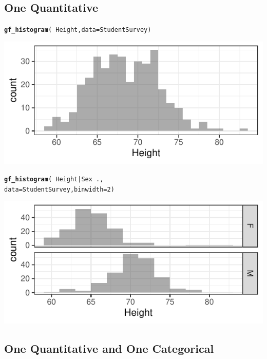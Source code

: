 \documentclass[10pt]{report}\usepackage[]{graphicx}\usepackage[]{xcolor}
\makeatletter
\newcommand{\hlnum}[1]{\textcolor[rgb]{0.686,0.059,0.569}{#1}}%
\newcommand{\hlopt}[1]{\textcolor[rgb]{0,0,0}{#1}}%
\newcommand{\hldef}[1]{\textcolor[rgb]{0.345,0.345,0.345}{#1}}%
\newcommand{\hlkwc}[1]{\textcolor[rgb]{0.333,0.667,0.333}{#1}}%
\newcommand{\hlkwd}[1]{\textcolor[rgb]{0.737,0.353,0.396}{\textbf{#1}}}%
\newenvironment{kframe}{%
 \def\at@end@of@kframe{}%
 \ifinner\ifhmode%
  \def\at@end@of@kframe{\end{minipage}}%
  \begin{minipage}{\columnwidth}%
 \fi\fi%
 \def\FrameCommand##1{\hskip\@totalleftmargin \hskip-\fboxsep
 \colorbox{shadecolor}{##1}\hskip-\fboxsep
     \hskip-\linewidth \hskip-\@totalleftmargin \hskip\columnwidth}%
 \MakeFramed {\advance\hsize-\width
   \@totalleftmargin\z@ \linewidth\hsize
   \@setminipage}}%
 {\par\unskip\endMakeFramed%
 \at@end@of@kframe}
\newenvironment{knitrout}{}{} %
\makeatother
\begin{document}
\begin{multicols}{3}
\begin{knitrout}
{}


\end{knitrout}
\vspace*{-.20in}

\subsection*{One Quantitative}
\begin{knitrout}\small
{}\color{fgcolor}\begin{kframe}
\begin{alltt}
\hlkwd{gf_histogram}\hldef{(}\hlopt{~} \hldef{Height,} \hlkwc{data} \hldef{= StudentSurvey)}
\end{alltt}
\end{kframe}

{\centering \includegraphics[width=.25\textwidth,height=.125\textwidth]{figure/stu-hist1-1} 

}


\end{knitrout}
\vspace*{-.20in}
\begin{knitrout}\small
{}\color{fgcolor}\begin{kframe}
\begin{alltt}
\hlkwd{gf_histogram}\hldef{(}\hlopt{~} \hldef{Height} \hlopt{|} \hldef{Sex} \hlopt{~} \hldef{.,}
             \hlkwc{data} \hldef{= StudentSurvey,} \hlkwc{binwidth} \hldef{=} \hlnum{2}\hldef{)}
\end{alltt}
\end{kframe}

{\centering \includegraphics[width=.25\textwidth,height=.125\textwidth]{figure/stu-hist2-1} 

}


\end{knitrout}

\subsection*{One Quantitative and One Categorical}
\vspace*{-.15in}


\end{multicols}
\end{document}
